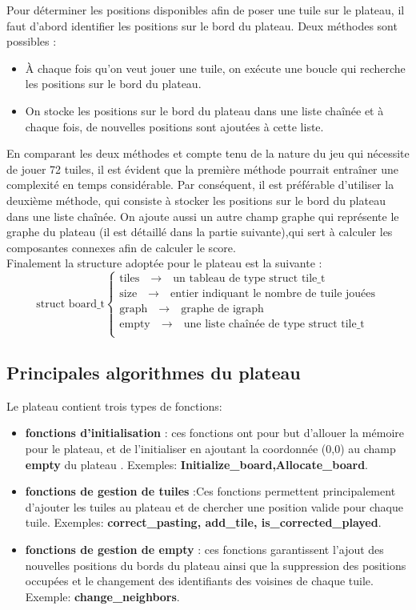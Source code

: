 Pour déterminer les positions disponibles afin de poser une tuile sur le plateau, il faut d'abord identifier les positions sur le bord du plateau. Deux méthodes sont possibles :
\begin{itemize}
    \item À chaque fois qu'on veut jouer une tuile, on exécute une boucle qui recherche les positions sur le bord du plateau.
    \item On stocke les positions sur le bord du plateau dans une liste chaînée et à chaque fois, de nouvelles positions sont ajoutées à cette liste. 
\end{itemize}
En comparant les deux méthodes et compte tenu de la nature du jeu qui nécessite de jouer 72 tuiles, il est évident que la première méthode pourrait entraîner une complexité en temps considérable. Par conséquent, il est préférable d'utiliser la deuxième méthode, qui consiste à stocker les positions sur le bord du plateau dans une liste chaînée. 
On ajoute aussi  un autre champ graphe qui représente le graphe du plateau (il est détaillé dans la partie suivante),qui sert à calculer les composantes connexes afin de calculer le score.\\

Finalement la structure adoptée pour le plateau est la suivante :
\[
\text{struct board\_t} \left\{
\begin{array}{l}
\text{tiles} \quad \rightarrow \quad \text{un tableau de type struct tile\_t }\\
\text{size} \quad \rightarrow \quad \text{entier indiquant le nombre de tuile jouées}\\
\text{graph} \quad \rightarrow \quad \text{graphe de igraph }\\
\text{empty} \quad \rightarrow \quad \text{une liste chaînée de type struct tile\_t  }\\
\end{array}
\right.
\]
\subsection{Principales algorithmes du plateau}
Le plateau contient trois types de  fonctions:
\begin{itemize}
    \item \textbf{fonctions d'initialisation} : ces fonctions ont pour but d'allouer la mémoire pour le plateau, et de l'initialiser en ajoutant la coordonnée (0,0) au champ \textbf{empty} du plateau . Exemples: \textbf{Initialize\_board,Allocate\_board}.
    \item \textbf{fonctions de gestion de tuiles} :Ces fonctions permettent principalement d'ajouter les tuiles au plateau et de chercher une position valide pour chaque tuile. Exemples: \textbf{correct\_pasting, add\_tile, is\_corrected\_played}.
    \item \textbf{fonctions de gestion de empty} : ces fonctions garantissent l'ajout des nouvelles positions du bords du plateau ainsi que la suppression des positions occupées et le changement des identifiants des voisines de chaque tuile. Exemple:\textbf{ change\_neighbors}.
\end{itemize}
